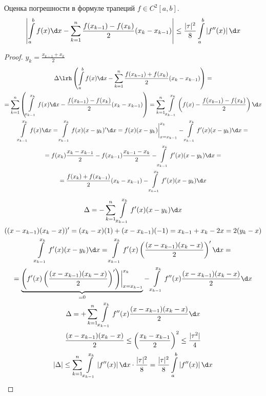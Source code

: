 \begin{theorem}{Оценка погрешности в формуле трапеций}
	$f \in C^2[a, b]$.
	\[ \left| \int\limits_a^b f(x)\d x - \sum_{k=1}^n \frac{f(x_{k-1}) - f(x_k)}{2}(x_k - x_{k-1}) \right| \le \frac{|\tau|^2}8 \int\limits_a^b \left|f''(x)\right|\d x \]
\end{theorem}
\begin{proof}
	$y_k = \frac{x_{k-1} + x_k}2$
	\begin{gather*}
		\Delta \lrh \left(\int\limits_a^b f(x)\d x - \sum_{k=1}^n \frac{f(x_{k-1}) + f(x_k)}{2}(x_k - x_{k-1}) \right) = \\
		= \sum_{k=1}^n \left(\int\limits_{x_{k-1}}^{x_k} f(x)\d x - \frac{f(x_{k-1}) - f(x_k)}{2}(x_k - x_{k-1}) \right)
			= \sum_{k=1}^n \int\limits_{x_{k-1}}^{x_k} \left(f(x) - \frac{f(x_{k-1}) - f(x_k)}{2}\right)\d x \\
		\int\limits_{x_{k-1}}^{x_k} f(x) \d x = \int\limits_{x_{k-1}}^{x_k} f(x)(x - y_k)'\d x = f(x) (x-y_k) \biggr|_{x=x_{k-1}}^{x_k} - \int\limits_{x_{k-1}}^{x_k} f'(x)(x-y_k)\d x = \\
		= f(x_k) \frac{x_k - x_{k-1}}2 - f(x_{k-1}) \frac{x_{k-1} - x_k}2 - \int\limits_{x_{k-1}}^{x_k} f'(x)(x-y_k)\d x = \\
		= \frac{f(x_k) + f(x_{k-1})}2 (x_k - x_{k-1}) - \int\limits_{x_{k-1}}^{x_k} f'(x)(x-y_k)\d x \\
	\end{gather*}
	\begin{gather*}
		\Delta = -\sum_{k=1}^n \int\limits_{x_{k-1}}^{x_k} f'(x)(x-y_k)\d x \\
		((x - x_{k-1})(x_k - x))' = (x_k - x)(1) + (x - x_{k-1})(-1) = x_{k-1} + x_k - 2x = 2(y_k - x) \\
		\int\limits_{x_{k-1}}^{x_k} f'(x)(x-y_k)\d x = \int\limits_{x_{k-1}}^{x_k} f'(x)\left(\frac{(x - x_{k-1})(x_k - x)}2\right)'\d x = \\
		= \underbrace{\left(f'(x)\left(\frac{(x - x_{k-1})(x_k - x)}2\right)'\right)\biggr|_{x = x_{k-1}}^{x_k}}_{=0} - \int\limits_{x_{k-1}}^{x_k} f''(x) \frac{(x - x_{k-1})(x_k - x)}2 \d x\\
		\Delta = +\sum_{k=1}^n \int\limits_{x_{k-1}}^{x_k} f''(x) \frac{(x - x_{k-1})(x_k - x)}2 \d x \\
		\frac{(x - x_{k-1})(x_k - x)}2 \le \left(\frac{x_k - x_{k-1}}2\right)^2 \le \frac{|\tau^2|}4 \\
		|\Delta| \le \sum_{k=1}^n \int\limits_{x_{k-1}}^{x_k} \left|f''(x)\right| \d x \cdot \frac{|\tau|^2}8 = \frac{|\tau|^2}8 \int\limits_a^b \left|f''(x)\right|\d x
	\end{gather*}
\end{proof}

